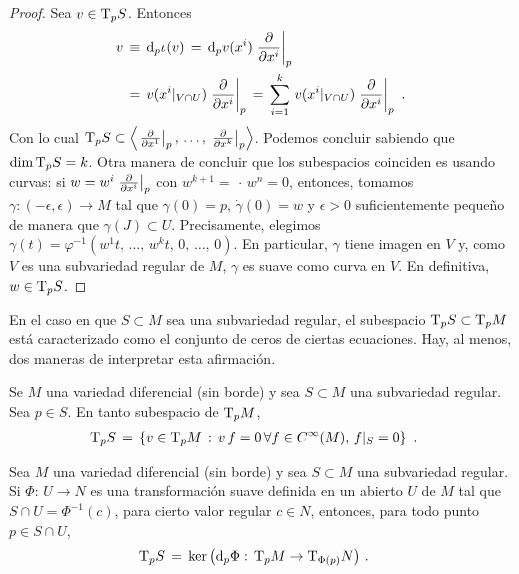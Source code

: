 \begin{proof}
	Sea $v\in\tangente[p]{S}$. Entonces
	\begin{align*}
		v & \,\equiv\,\diferencial[p]{\inc}(v) \,=\,
			\diferencial[p]{v}(x^{i})\gancho[p]{x^{i}} \\
		& \,=\, v(x^{i}|_{V\cap U})\gancho[p]{x^{i}} \,=\,
			\sum_{i=1}^{k}\,v(x^{i}|_{V\cap U})\gancho[p]{x^{i}}
		\text{ .}
	\end{align*}
	Con lo cual
	$\tangente[p]{S}\subset\generado{\gancho[p]{x^{1}},\,\dots,\,%
	\gancho[p]{x^{k}}}$. Podemos concluir sabiendo que
	$\dim\,\tangente[p]{S}=k$. Otra manera de concluir que los
	subespacios coinciden es usando curvas: si $w=w^{i}\gancho[p]{x^{i}}$
	con $w^{k+1}=\,\cdot\,w^{n}=0$, entonces, tomamos
	$\gamma:(-\epsilon,\epsilon)\rightarrow M$ tal que
	$\gamma(0)=p$, $\dot{\gamma}(0)=w$ y $\epsilon>0$ suficientemente
	peque\~{n}o de manera que $\gamma(J)\subset U$. Precisamente,
	elegimos
	$\gamma(t)=\varphi^{-1}(w^{1}t,\,\dots,\,w^{k}t,\,0,\,\dots,\,0)$.
	En particular, $\gamma$ tiene imagen en $V$ y, como $V$ es una
	subvariedad regular de $M$, $\gamma$ es suave como curva en $V$.
	En definitiva, $w\in\tangente[p]{S}$.
\end{proof}

En el caso en que $S\subset M$ sea una subvariedad regular, el subespacio
$\tangente[p]{S}\subset\tangente[p]{M}$ est\'{a} caracterizado como el
conjunto de ceros de ciertas ecuaciones. Hay, al menos, dos maneras de
interpretar esta afirmaci\'{o}n.

\begin{propoTangenteSubvarRegularI}\label{thm:tangentesubvarregulari}
	Se $M$ una variedad diferencial (sin borde) y sea $S\subset M$ una
	subvariedad regular. Sea $p\in S$. En tanto subespacio de
	$\tangente[p]{M}$,
	\begin{align*}
		\tangente[p]{S} & \,=\,\left\lbrace v\in\tangente[p]{M}\,:\,
			v\,f=0\,\forall f\in C^{\infty}(M),\, f|_{S}=0
			\right\rbrace
		\text{ .}
	\end{align*}
\end{propoTangenteSubvarRegularI}

\begin{propoTangenteSubvarRegularII}\label{thm:tangentesubvarregularii}
	Sea $M$ una variedad diferencial (sin borde) y sea $S\subset M$ una
	subvariedad regular. Si $\Phi:\,U\rightarrow N$ es una
	transformaci\'{o}n suave definida en un abierto $U$ de $M$ tal que
	$S\cap U=\Phi^{-1}(c)$, para cierto valor regular $c\in N$, entonces,
	para todo punto $p\in S\cap U$,
	\begin{align*}
		\tangente[p]{S} & \,=\, \ker\,\big(\diferencial[p]{\Phi}:\,
			\tangente[p]{M}\rightarrow\tangente[\Phi(p)]{N}\big)
		\text{ .}
	\end{align*}
\end{propoTangenteSubvarRegularII}

